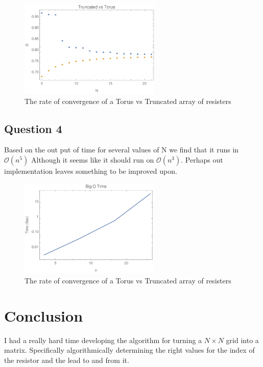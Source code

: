 \documentclass{article}
\begin{document}
\begin{figure}[!htb]
	\begin{center}
		\includegraphics[width=0.6\textwidth]{p3.pdf}
	\end{center}
	\caption{The rate of convergence of a Torus vs Truncated array of resisters}
\label{fig:qual}
\end{figure}
\FloatBarrier

\subsection{Question 4}

Based on the out put of time for several values of N we find that it runs in $\mathcal{O}(n^5)$ Although it seems like it should run on $\mathcal{O}(n^3)$. Perhaps out implementation leaves something to be improved upon.

\begin{figure}[!htb]
	\begin{center}
		\includegraphics[width=0.6\textwidth]{p4.pdf}
	\end{center}
	\caption{The rate of convergence of a Torus vs Truncated array of resisters}
\label{fig:qual}
\end{figure}
\FloatBarrier

\section{Conclusion}

I had a really hard time developing the algorithm for turning a $N \times N$ grid into a matrix. Specifically algorithmically determining the right values for the index of the resistor and the lead to and from it. 
\end{document}
